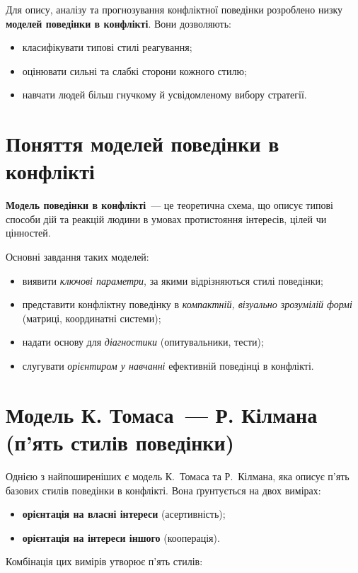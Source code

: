 \documentclass[12pt,a4paper]{article}
\begin{document}
    Для опису, аналізу та прогнозування конфліктної поведінки розроблено низку \textbf{моделей поведінки в конфлікті}. 
    Вони дозволяють:
    \begin{itemize}
        \item класифікувати типові стилі реагування;
        \item оцінювати сильні та слабкі сторони кожного стилю;
        \item навчати людей більш гнучкому й усвідомленому вибору стратегії.
    \end{itemize}

    \section*{Поняття моделей поведінки в конфлікті}
    \textbf{Модель поведінки в конфлікті}~--- це теоретична схема, що описує типові способи дій та реакцій людини 
    в умовах протистояння інтересів, цілей чи цінностей.

    Основні завдання таких моделей:
    \begin{itemize}
        \item виявити \textit{ключові параметри}, за якими відрізняються стилі поведінки;
        \item представити конфліктну поведінку в \textit{компактній, візуально зрозумілій формі} (матриці, координатні системи);
        \item надати основу для \textit{діагностики} (опитувальники, тести);
        \item слугувати \textit{орієнтиром у навчанні} ефективній поведінці в конфлікті.
    \end{itemize}

    \section*{Модель К. Томаса~--- Р. Кілмана (п’ять стилів поведінки)}
    Однією з найпоширеніших є модель К.~Томаса та Р.~Кілмана, яка описує п’ять базових стилів поведінки в конфлікті. 
    Вона ґрунтується на двох вимірах:
    \begin{itemize}
        \item \textbf{орієнтація на власні інтереси} (асертивність);
        \item \textbf{орієнтація на інтереси іншого} (кооперація).
    \end{itemize}

    Комбінація цих вимірів утворює п’ять стилів:
\end{document}
